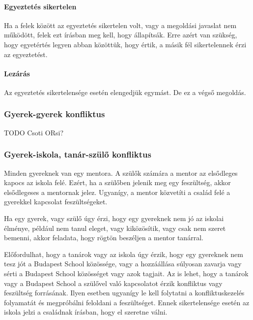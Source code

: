 \paragraph{Egyeztetés sikertelen}\label{egyeztetuxe9s-sikertelen}

Ha a felek között az egyeztetés sikertelen volt, vagy a megoldási
javaslat nem működött, felek ezt írásban meg kell, hogy állapítsák. Erre
azért van szükség, hogy egyetértés legyen abban közöttük, hogy értik, a
másik fél sikertelennek érzi az egyeztetést.

\paragraph{Lezárás}\label{lezuxe1ruxe1s}

Az egyeztetés sikertelensége esetén elengedjük egymást. De ez a végső
megoldás.

\subsubsection{Gyerek-gyerek
  konfliktus}\label{gyerek-gyerek-konfliktus}

TODO Csoti ORsi?

\subsubsection{Gyerek-iskola, tanár-szülő
  konfliktus}\label{gyerek-iskola-tanuxe1r-szuxfclux151-konfliktus}

Minden gyereknek van egy mentora. A szülők számára a mentor az
elsődleges kapocs az iskola felé. Ezért, ha a szülőben jelenik meg egy
feszültség, akkor elsődlegeses a mentornak jelez. Ugyanígy, a mentor
közvetíti a család felé a gyerekkel kapcsolat feszültségeket.

Ha egy gyerek, vagy szülő úgy érzi, hogy egy gyereknek nem jó az iskolai
élménye, például nem tanul eleget, vagy kiközösítik, vagy csak nem
szeret bemenni, akkor feladata, hogy rögtön beszéljen a mentor tanárral.

Előfordulhat, hogy a tanárok vagy az iskola úgy érzik, hogy egy
gyereknek nem tesz jót a Budapest School közössége, vagy a hozzáállása
súlyosan zavarja vagy sérti a Budapest School közösséget vagy azok
tagjait. Az is lehet, hogy a tanárok vagy a Budapest School a szülővel
való kapcsolatot érzik konfliktus vagy feszültség forrásának. Ilyen
esetben ugyanígy le kell folytatni a konfliktuskezelés folyamatát és
megpróbálni feloldani a feszültséget. Ennek sikertelensége esetén az
iskola jelzi a családnak írásban, hogy el szeretne válni.

